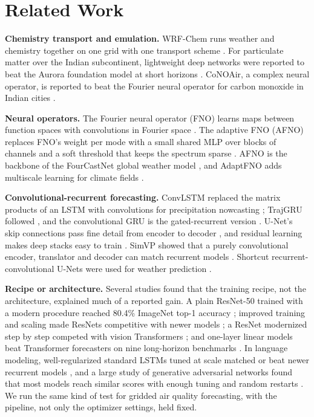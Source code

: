 \documentclass[journal]{IEEEtran}
\begin{document}
\section{Related Work}
\label{sec:related}
\textbf{Chemistry transport and emulation.} WRF-Chem runs weather and chemistry together on one grid with one transport scheme \cite{grell2005}. For particulate matter over the Indian subcontinent, lightweight deep networks were reported to beat the Aurora foundation model at short horizons \cite{kushwaha2025}. CoNOAir, a complex neural operator, is reported to beat the Fourier neural operator for carbon monoxide in Indian cities \cite{bedi2025conoair}.

\textbf{Neural operators.} The Fourier neural operator (FNO) learns maps between function spaces with convolutions in Fourier space \cite{li2021fno}. The adaptive FNO (AFNO) replaces FNO's weight per mode with a small shared MLP over blocks of channels and a soft threshold that keeps the spectrum sparse \cite{guibas2022afno}. AFNO is the backbone of the FourCastNet global weather model \cite{pathak2022fourcastnet}, and AdaptFNO adds multiscale learning for climate fields \cite{dang2025adaptfno}.

\textbf{Convolutional-recurrent forecasting.} ConvLSTM replaced the matrix products of an LSTM with convolutions for precipitation nowcasting \cite{shi2015convlstm}; TrajGRU followed \cite{shi2017trajgru}, and the convolutional GRU is the gated-recurrent version \cite{ballas2016convgru}. U-Net's skip connections pass fine detail from encoder to decoder \cite{ronneberger2015unet}, and residual learning makes deep stacks easy to train \cite{he2016}. SimVP showed that a purely convolutional encoder, translator and decoder can match recurrent models \cite{gao2022simvp}. Shortcut recurrent-convolutional U-Nets were used for weather prediction \cite{leinonen2021}.

\textbf{Recipe or architecture.} Several studies found that the training recipe, not the architecture, explained much of a reported gain. A plain ResNet-50 trained with a modern procedure reached 80.4\% ImageNet top-1 accuracy \cite{wightman2021}; improved training and scaling made ResNets competitive with newer models \cite{bello2021}; a ResNet modernized step by step competed with vision Transformers \cite{liu2022convnext}; and one-layer linear models beat Transformer forecasters on nine long-horizon benchmarks \cite{zeng2023}. In language modeling, well-regularized standard LSTMs tuned at scale matched or beat newer recurrent models \cite{melis2018}, and a large study of generative adversarial networks found that most models reach similar scores with enough tuning and random restarts \cite{lucic2018}. We run the same kind of test for gridded air quality forecasting, with the pipeline, not only the optimizer settings, held fixed.
\end{document}

